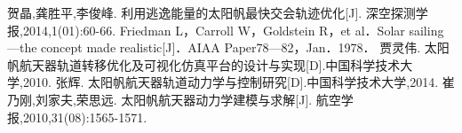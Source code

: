 \documentclass[../Paper.tex]{subfiles}
\begin{document}
\begin{thebibliography}{99}

 贺晶,龚胜平,李俊峰. 利用逃逸能量的太阳帆最快交会轨迹优化[J]. 深空探测学报,2014,1(01):60-66. 
 Friedman L，Carroll W，Goldstein R，et al．Solar sailing—the concept made realistic[J]．AIAA Paper78—82，Jan．1978．
贾灵伟. 太阳帆航天器轨道转移优化及可视化仿真平台的设计与实现[D].中国科学技术大学,2010.
张辉. 太阳帆航天器轨道动力学与控制研究[D].中国科学技术大学,2014.
崔乃刚,刘家夫,荣思远. 太阳帆航天器动力学建模与求解[J]. 航空学报,2010,31(08):1565-1571. 
	
\end{thebibliography}
\end{document}

